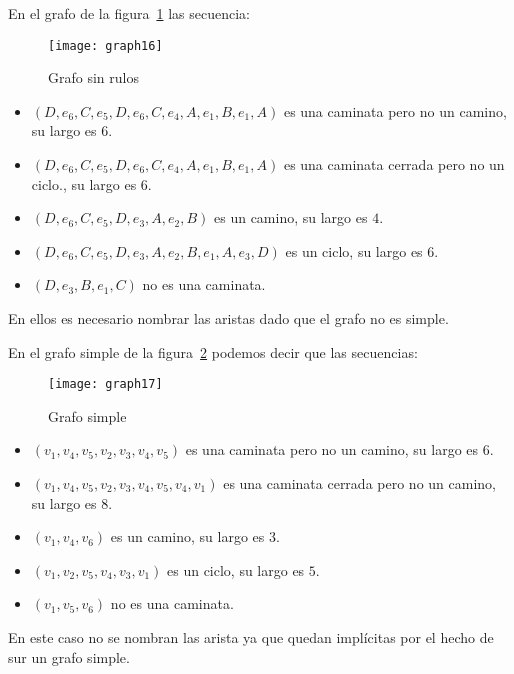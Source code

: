 \begin{ejemplo}
En el grafo de la figura~\ref{fig:graph16-b} las secuencia:
\begin{figure}[h!]
\centering
\texttt{[image: graph16]}
\caption{Grafo sin rulos}
\label{fig:graph16-b}
\end{figure}
\begin{itemize} 
  \itemsep 0pt
  \item $(D,e_6,C,e_5,D,e_6,C,e_4,A,e_1,B,e_1,A)$ es una caminata pero no un camino, su largo es 6.
  \item $(D,e_6,C,e_5,D,e_6,C,e_4,A,e_1,B,e_1,A)$ es una caminata cerrada pero no un ciclo., su largo es 6.
  \item $(D,e_6,C,e_5,D,e_3,A,e_2,B)$ es un camino, su largo es $4$.
  \item $(D,e_6,C,e_5,D,e_3,A,e_2,B,e_1,A,e_3,D)$ es un ciclo, su largo es $6$.
  \item $(D,e_3,B,e_1,C)$ no es una caminata.
\end{itemize}
En ellos es necesario nombrar las aristas dado que el grafo no es simple.

En el grafo simple de la figura~\ref{fig:graph17} podemos decir que las secuencias:
\begin{figure}[h!]
\centering
\texttt{[image: graph17]}
\caption{Grafo simple}
\label{fig:graph17}
\end{figure}
\begin{itemize}
  \itemsep 0pt
  \item $(v_1,v_4,v_5,v_2,v_3,v_4,v_5)$ es una caminata pero no un camino, su largo es $6$.
  \item $(v_1,v_4,v_5,v_2,v_3,v_4,v_5,v_4,v_1)$ es una caminata cerrada pero no un camino, su largo es $8$.
  \item $(v_1,v_4,v_6)$ es un camino, su largo es $3$.
  \item $(v_1,v_2,v_5,v_4,v_3,v_1)$ es un ciclo, su largo es $5$.
  \item $(v_1,v_5,v_6)$ no es una caminata.
\end{itemize}
En este caso no se nombran las arista ya que quedan implícitas por el hecho de sur un grafo simple.
\end{ejemplo}

